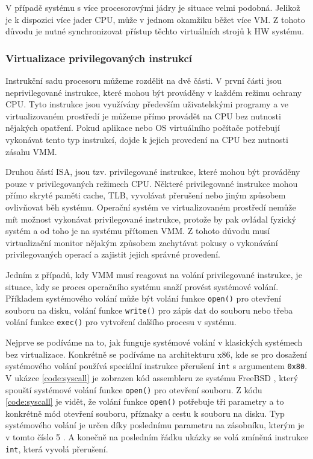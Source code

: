 V případě systému s více procesorovými jádry je situace velmi podobná. Jelikož je k dispozici více jader CPU, může v jednom okamžiku běžet více VM. Z tohoto důvodu je nutné synchronizovat přístup těchto virtuálních strojů k HW systému.

\subsubsection{Virtualizace privilegovaných instrukcí}

Instrukční sadu procesoru můžeme rozdělit na dvě části. V první části jsou neprivilegované instrukce, které mohou být prováděny v každém režimu ochrany CPU. Tyto instrukce jsou využívány především uživatelskými programy a ve virtualizovaném
prostředí je můžeme přímo provádět na CPU bez nutnosti nějakých opatření. Pokud aplikace nebo OS virtuálního počítače potřebují vykonávat tento typ instrukcí, dojde k jejich provedení na CPU bez nutnosti zásahu VMM.

Druhou částí ISA, jsou tzv. privilegované instrukce, které mohou být prováděny pouze v privilegovaných režimech CPU. Některé privilegované instrukce mohou přímo skryté paměti cache, TLB, vyvolávat přerušení nebo
jiným způsobem ovlivňovat běh systému. Operační systém ve virtualizovaném prostředí nemůže mít možnost vykonávat privilegované instrukce, protože by pak ovládal fyzický systém a od toho je na systému přítomen VMM.
Z tohoto důvodu musí virtualizační monitor nějakým způsobem zachytávat pokusy o vykonávání privilegovaných operací a zajistit jejich správné provedení.

Jedním z případů, kdy VMM musí reagovat na volání privilegované instrukce, je situace, kdy se proces operačního systému snaží provést systémové volání. Příkladem systémového volání může být volání funkce \verb|open()| pro otevření
souboru na disku, volání funkce \verb|write()| pro zápis dat do souboru nebo třeba volání funkce \verb|exec()| pro vytvoření dalšího procesu v systému.

Nejprve se podíváme na to, jak funguje systémové volání v klasických systémech bez virtualizace. Konkrétně se podíváme na architekturu x86, kde se pro dosažení systémového volání používá speciální instrukce přerušení \verb|int| s argumentem 
\verb|0x80|. V ukázce \ref{code:syscall} je zobrazen kód assembleru ze systému FreeBSD \cite{freebsd_syscall}, který spouští systémové volání funkce \verb|open()| pro otevření souboru. Z kódu \ref{code:syscall} je vidět, že volání funkce \verb|open()|
potřebuje tři parametry a to konkrétně mód otevření souboru, příznaky a cestu k souboru na disku. Typ systémového volání je určen díky poslednímu parametru na zásobníku, kterým je v tomto číslo 5 \cite{vmm_book}. A konečně na posledním řádku ukázky se
volá zmíněná instrukce \verb|int|, která vyvolá přerušení.

